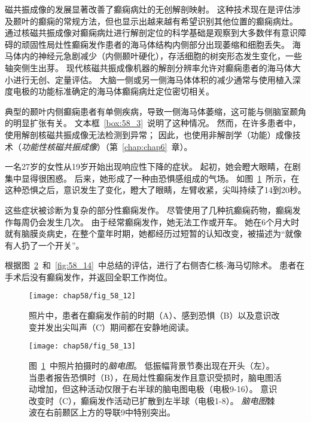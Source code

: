 磁共振成像的发展显著改善了癫痫病灶的无创解剖映射。
这种技术现在是评估涉及颞叶的癫痫的常规方法，但也显示出越来越有希望识别其他位置的癫痫病灶。
通过核磁共振成像对癫痫病灶进行解剖定位的科学基础是观察到大多数伴有意识障碍的顽固性局灶性癫痫发作患者的海马体结构内侧部分出现萎缩和细胞丢失。
海马体内的神经元急剧减少（内侧颞叶硬化），存活细胞的树突形态发生变化，一些轴突侧生出芽。
现代核磁共振成像机器的解剖分辨率允许对癫痫患者的海马体大小进行无创、定量评估。
大脑一侧或另一侧海马体体积的减少通常与使用植入深度电极的功能标准确定的海马体癫痫病灶定位密切相关。


典型的颞叶内侧癫痫患者有单侧疾病，导致一侧海马体萎缩，这可能与侧脑室颞角的明显扩张有关。
文本框~\ref{box:58_3}~说明了这种情况。
然而，在许多患者中，使用解剖核磁共振成像无法检测到异常；
因此，也使用非解剖学（功能）成像技术（\textit{功能性核磁共振成像}）（第~\ref{chap:chap6}~章）。


\begin{proposition}[神经解剖学导航术语] \label{box:58_3}
	
	\quad \quad 一名27岁的女性从19岁开始出现响应性下降的症状。
	起初，她会瞪大眼睛，在剧集中显得很困惑。
	后来，她形成了一种由恐惧感组成的气场。
	如图~\ref{fig:58_12}~所示，在这种恐惧之后，意识发生了变化，瞪大了眼睛，左臂收紧，尖叫持续了14到20秒。
	
	\quad \quad 这些症状被诊断为复杂的部分性癫痫发作。
	尽管使用了几种抗癫痫药物，癫痫发作每周仍会发生几次。
	由于经常癫痫发作，她无法工作或开车。
	她在6个月大时就有脑膜炎病史，在整个童年时期，她都经历过短暂的认知改变，被描述为“就像有人扔了一个开关”。
	
	\quad \quad 根据图~\ref{fig:58_13}~和~\ref{fig:58_14}~中总结的评估，进行了右侧杏仁核-海马切除术。
	患者在手术后没有癫痫发作，并返回全职工作岗位。
	
\end{proposition}


\begin{figure}[htbp]
	\centering
	\texttt{[image: chap58/fig\_58\_12]}
	\caption{照片中，患者在癫痫发作前的时期（A）、感到恐惧（B）以及意识改变并发出尖叫声（C）期间都在安静地阅读。}
	\label{fig:58_12}
\end{figure}


\begin{figure}[htbp]
	\centering
	\texttt{[image: chap58/fig\_58\_13]}
	\caption{图~\ref{fig:58_12}~中照片拍摄时的\textit{脑电图}。
		低振幅背景节奏出现在开头（左）。
		当患者报告恐惧时（B），在局灶性癫痫发作且意识受损时，脑电图活动增加，但这种活动仅限于右半球的脑电图电极（电极9-16）。
		意识改变时（C），癫痫发作活动已扩散到左半球（电极1-8）。
		\textit{脑电图}棘波在右前颞区上方的导联9中特别突出。}
	\label{fig:58_13}
\end{figure}


